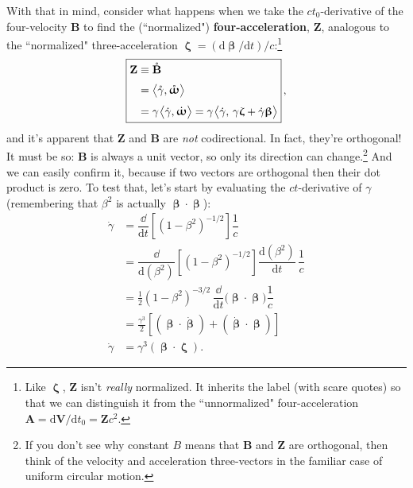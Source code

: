 \documentclass[12pt]{article}
\renewcommand{\vv}[1]{\mathbf{#1}}
\newcommand{\dd}[1]{\mathrm{d}#1}
\newcommand{\vvbeta}{\bm{\upbeta}}
\newcommand{\vvomega}{\bm{\upomega}}
\newcommand{\vvzeta}{\bm{\upzeta}}
\begin{document}
With that in mind, consider what happens when we take the $c t_0$-derivative of the four-velocity $\vv B$ to find the (``normalized") \textbf{four-acceleration}, $\vv Z$, analogous to the ``normalized" three-acceleration $\vvzeta=(\dd \vvbeta / \dd t)/c$:\footnote{Like $\vvzeta$, $\vv Z$ isn't \emph{really} normalized. It inherits the label (with scare quotes) so that we can distinguish it from the ``unnormalized" four-acceleration $\vv A = \dd \vv V / \dd t_0 = \vv Z c^2$.}
\begin{equation}\label{eq:34}
\boxed{
\begin{aligned}
\vv Z &\equiv \mathring{\vv B} \\[2pt]
&= \big \langle \mathring{\gamma}, \mathring{\vvomega} \big \rangle \\[3pt]
&= \gamma \mkern1.5mu \big \langle \dot{\gamma}, \dot{\vvomega} \big \rangle = \gamma \mkern1.5mu \big \langle \dot{\gamma}, \, \gamma \vvzeta + \dot{\gamma} \vvbeta \big \rangle
\end{aligned}
} \, ,
\end{equation}
and it's apparent that $\vv Z$ and $\vv B$ are \emph{not} codirectional. In fact, they're orthogonal! It must be so: $\vv B$ is always a unit vector, so only its direction can change.\footnote{If you don't see why constant $B$ means that $\vv B$ and $\vv Z$ are orthogonal, then think of the velocity and acceleration three-vectors in the familiar case of uniform circular motion.} And we can easily confirm it, because if two vectors are orthogonal then their dot product is zero. To test that, let's start by evaluating the $ct$-derivative of $\gamma$ (remembering that $\beta^2$ is actually $\vvbeta \cdot \vvbeta$):
\begin{equation}\label{eq:gd}
\begin{split}
\dot{\gamma} &= \dfrac{\dd}{\dd t} \left[ \left(1-\beta^2 \right)^{-1/2} \right] \dfrac{1}{c} \\[5pt]
&= \dfrac{\dd}{\dd ( \beta^2 )} \left[ \left( 1 - \beta^2 \right)^{-1/2} \right] \dfrac{\dd (\beta^2)}{\dd t} \, \dfrac{1}{c}  \\[5pt]
&= \frac{1}{2} \left( 1 - \beta ^2 \right)^{-3/2} \, \dfrac{\dd}{\dd t} \bigl( \vvbeta \cdot \vvbeta \bigr) \dfrac{1}{c} \\[5pt]
&= \frac{\gamma^3}{2} \left[ ( \vvbeta \cdot \dot{\vvbeta} ) + ( \dot{\vvbeta} \cdot \vvbeta ) \right] \\[5pt]
\dot{\gamma} &= \gamma^3 (\vvbeta \cdot \vvzeta).
\end{split}
\end{equation}
\end{document}

